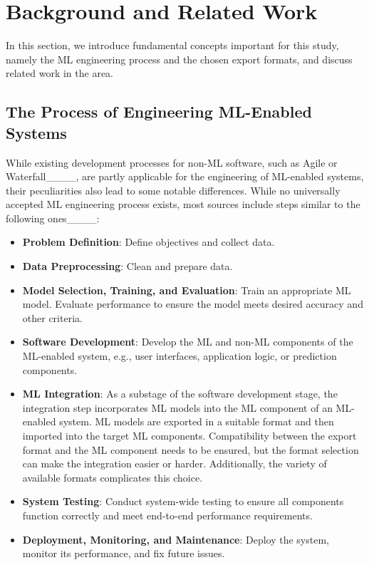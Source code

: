 \section{Background and Related Work}
In this section, we introduce fundamental concepts important for this study, namely the ML engineering process and the chosen export formats, and discuss related work in the area.

\subsection{The Process of Engineering ML-Enabled Systems}
While existing development processes for non-ML software, such as Agile or Waterfall____, are partly applicable for the engineering of ML-enabled systems,
their peculiarities also lead to some notable differences.
While no universally accepted ML engineering process exists, most sources include steps similar to the following ones____:

\begin{itemize}
    \item \textbf{Problem Definition}: Define objectives and collect data.
    \item \textbf{Data Preprocessing}: Clean and prepare data.
    \item \textbf{Model Selection, Training, and Evaluation}: Train an appropriate ML model. Evaluate performance to ensure the model meets desired accuracy and other criteria.
    \item \textbf{Software Development}: Develop the ML and non-ML components of the ML-enabled system, e.g., user interfaces, application logic, or prediction components.
    \item \textbf{ML Integration}: As a substage of the software development stage, the integration step incorporates ML models into the ML component of an ML-enabled system. ML models are exported in a suitable format and then imported into the target ML components. Compatibility between the export format and the ML component needs to be ensured, but the format selection can make the integration easier or harder. Additionally, the variety of available formats complicates this choice.
    \item \textbf{System Testing}: Conduct system-wide testing to ensure all components function correctly and meet end-to-end performance requirements.
    \item \textbf{Deployment, Monitoring, and Maintenance}: Deploy the system, monitor its performance, and fix future issues.
\end{itemize}

